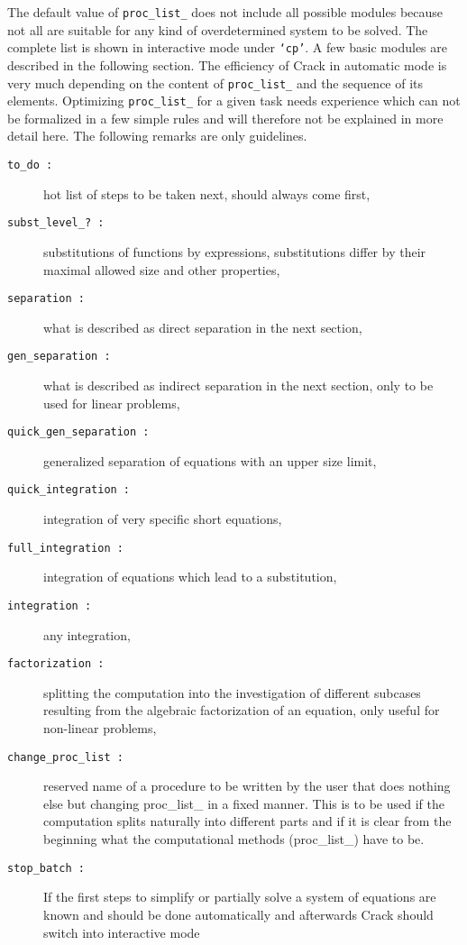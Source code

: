 \documentclass[12pt]{article}
\begin{document}
The default value of {\tt proc\_list\_} does not include all possible
modules because not all are suitable for any kind of overdetermined
system to be solved. The complete list is shown in interactive mode
under {\tt `cp'}. A few basic modules are described in the following
section. The efficiency of {\sc Crack} in automatic mode is very much
depending on the content of {\tt proc\_list\_} and the sequence of its
elements. Optimizing {\tt proc\_list\_} for a given task needs
experience which can not be formalized in a few simple rules and will
therefore not be explained in more detail here. The following remarks
are only guidelines.
\begin{description}    
\item[{\tt to\_do :}] hot list of steps to be taken next, should
always come first,
\item[{\tt subst\_level\_? :}] substitutions of functions by
expressions, substitutions differ by their maximal allowed size and other
properties,
\item[{\tt separation :}] what is described as direct separation in the
next section,
\item[{\tt gen\_separation :}] what is described as indirect separation in the
next section, only to be used for linear problems,
\item[{\tt quick\_gen\_separation :}] generalized separation of
equations with an upper size limit,
\item[{\tt quick\_integration :}] integration of very specific short equations,
\item[{\tt full\_integration :}] integration of equations which lead
to a substitution,
\item[{\tt integration :}] any integration,
\item[{\tt factorization :}] splitting the computation into the
investigation of different subcases resulting from the algebraic
factorization of an equation, only useful for non-linear problems,
\item[{\tt change\_proc\_list :}] reserved name of a procedure to be
written by the user that does nothing else but changing proc\_list\_ in
a fixed manner. This is to be used if the computation splits naturally
into different parts and if it is clear from the beginning what the
computational methods (proc\_list\_) have to be.
\item[{\tt stop\_batch :}] If the first steps to simplify or partially
solve a system of equations are known and should be done automatically
and afterwards {\sc Crack} should switch into interactive mode

\end{description}
\end{document}
